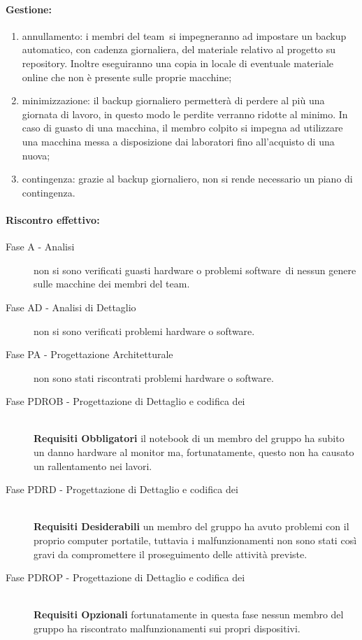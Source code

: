 \documentclass[../PianoProgetto.tex]{subfiles}
\begin{document}
	\paragraph*{Gestione:}
	\begin{enumerate}
		\item annullamento: i membri del team\g\ si impegneranno ad impostare un backup automatico, con cadenza giornaliera, del materiale relativo al progetto su repository\g . Inoltre eseguiranno una copia in locale di eventuale materiale online che non è presente sulle proprie macchine;
		\item minimizzazione: il backup giornaliero permetterà di perdere al più una giornata di lavoro, in questo modo le perdite verranno ridotte al minimo. In caso di guasto di una macchina, il membro colpito si impegna ad utilizzare una macchina messa a disposizione dai laboratori fino all'acquisto di una nuova;
		\item contingenza: grazie al backup giornaliero, non si rende necessario un piano di contingenza.
	\end{enumerate} 	
	
	
	\paragraph*{Riscontro effettivo:}
		\begin{description}
			\item[Fase A - Analisi] non si sono verificati guasti hardware o problemi software\g\ di nessun genere sulle macchine dei membri del team\g .
			\item[Fase AD - Analisi di Dettaglio] non si sono verificati problemi hardware o software\g.
			\item[Fase PA - Progettazione Architetturale] non sono stati riscontrati problemi hardware o software\g.
			\item[Fase PDROB - Progettazione di Dettaglio e codifica dei]  \ \\
					\textbf{Requisiti Obbligatori} il notebook di un membro del gruppo ha subito un danno hardware al monitor ma, fortunatamente, questo non ha causato un rallentamento nei lavori.
			\item[Fase PDRD - Progettazione di Dettaglio e codifica dei] \ \\
					\textbf{Requisiti Desiderabili} un membro del gruppo ha avuto problemi con il proprio computer portatile, tuttavia i malfunzionamenti non sono stati così gravi da compromettere il proseguimento delle attività previste.
			\item[Fase PDROP - Progettazione di Dettaglio e codifica dei]  \ \\
					\textbf{Requisiti Opzionali} fortunatamente in questa fase nessun membro del gruppo ha riscontrato malfunzionamenti sui propri dispositivi.
		\end{description}
\end{document}
